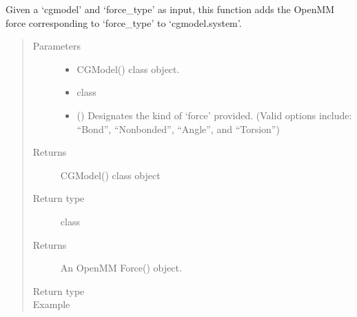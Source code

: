 \documentclass[letterpaper,12pt,english,openany,oneside]{sphinxmanual}
\begin{document}
\label{\detokenize{build:module-build.cg_build}}

\begin{fulllineitems}
\label{\detokenize{build:build.cg_build.add_force}}
Given a ‘cgmodel’ and ‘force\_type’ as input, this function adds
the OpenMM force corresponding to ‘force\_type’ to ‘cgmodel.system’.
\begin{quote}\begin{description}
\item[{Parameters}] \leavevmode\begin{itemize}
\item {} 
 \textendash{} CGModel() class object.

\item {} 
 \textendash{} class

\item {} 
 () \textendash{} Designates the kind of ‘force’ provided. (Valid options include: “Bond”, “Nonbonded”, “Angle”, and “Torsion”)

\end{itemize}

\item[{Returns}] \leavevmode
CGModel() class object

\item[{Return type}] \leavevmode
class

\item[{Returns}] \leavevmode
An OpenMM Force() object.

\item[{Return type}] \leavevmode
{}

\item[{Example}] \leavevmode
\end{description}\end{quote}


\end{fulllineitems}
\end{document}
